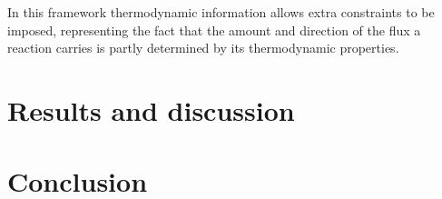 \documentclass[11pt]{article}
\begin{document}
In this framework thermodynamic information allows extra constraints to be
imposed, representing the fact that the amount and direction of the flux a
reaction carries is partly determined by its thermodynamic properties.

\section{Results and discussion}


\section{Conclusion}

\printbibliography
\end{document}
